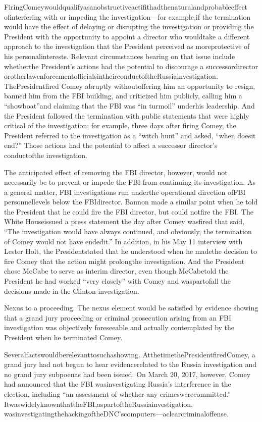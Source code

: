 {FiringComeywouldqualifyasanobstructiveactifithadthenaturalandprobableeffect ofinterfering with or impeding the investigation—for example,if the termination would have the effect of delaying or disrupting the investigation or providing the President with the opportunity to appoint a director who wouldtake a different approach to the investigation that the President perceived as moreprotective of his personalinterests.
Relevant circumstances bearing on that issue include whetherthe President’s actions had the potential to discourage a successordirector orotherlawenforcementofficialsintheirconductoftheRussiainvestigation.
ThePresidentfired Comey abruptly withoutoffering him an opportunity to resign, banned him from the FBI building, and criticized him publicly, calling him a “showboat”and claiming that the FBI was “in turmoil” underhis leadership.
And the President followed the termination with public statements that were highly critical of the investigation; for example, three days after firing Comey, the President referred to the investigation as a “witch hunt” and asked, “when doesit end?”
Those actions had the potential to affect a successor director’s conductofthe investigation.

The anticipated effect of removing the FBI director, however, would not necessarily be to prevent or impede the FBI from continuing its investigation.
As a general matter, FBI investigations run underthe operational direction ofFBI personnellevels below the FBIdirector.
Bannon made a similar point when he told the President that he could fire the FBI director, but could notfire the FBI.
The White Houseissued a press statement the day after Comey wasfired that said, “The investigation would have always continued, and obviously, the termination of Comey would not have endedit.”
In addition, in his May 11 interview with Lester Holt, the Presidentstated that he understood when he madethe decision to fire Comey that the action might prolongthe investigation.
And the President chose McCabe to serve as interim director, even though McCabetold the President he had worked “very closely” with Comey and waspartofall the decisions made in the Clinton investigation.

Nexus to a proceeding.
The nexus element would be satisfied by evidence showing that a grand jury proceeding or criminal prosecution arising from an FBI investigation was objectively foreseeable and actually contemplated by the President when he terminated Comey.

Severalfactswouldberelevanttosuchashowing.
AtthetimethePresidentfiredComey, a grand jury had not begun to hear evidencerelated to the Russia investigation and no grand jury subpoenas had been issued.
On March 20, 2017, however, Comey had announced that the FBI wasinvestigating Russia’s interference in the election, including “an assessment of whether any crimeswerecommitted.”
ItwaswidelyknownthattheFBI,aspartoftheRussiainvestigation, wasinvestigatingthehackingoftheDNC’scomputers—aclearcriminaloffense.

}

